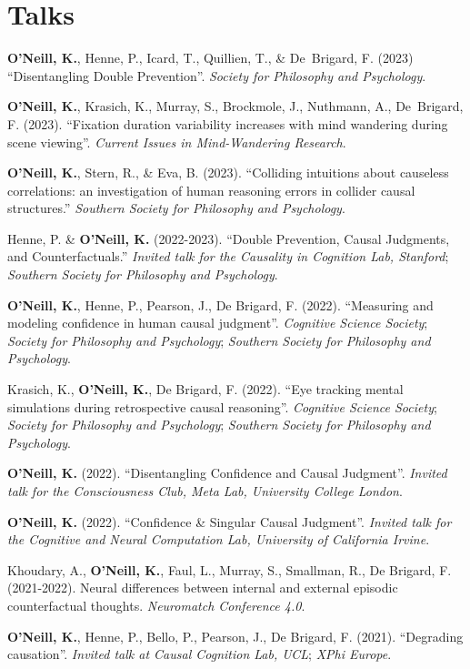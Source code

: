 \section{Talks}

\textbf{O'Neill, K.}, Henne, P., Icard, T., Quillien, T., \&
De~Brigard, F. (2023) ``Disentangling Double
Prevention''. \emph{Society for Philosophy and Psychology}.

\textbf{O'Neill, K.}, Krasich, K., Murray, S., Brockmole, J.,
Nuthmann, A., De~Brigard, F. (2023). ``Fixation duration variability
increases with mind wandering during scene viewing''. \emph{Current
Issues in Mind-Wandering Research}.

\textbf{O'Neill, K.}, Stern, R., \& Eva, B. (2023). ``Colliding
intuitions about causeless correlations: an investigation of human
reasoning errors in collider causal structures.'' \emph{Southern
Society for Philosophy and Psychology}.

Henne, P. \& \textbf{O'Neill, K.} (2022-2023). ``Double Prevention,
Causal Judgments, and Counterfactuals.'' \emph{Invited talk for the
Causality in Cognition Lab, Stanford}; \emph{Southern Society for
Philosophy and Psychology}.

\textbf{O'Neill, K.}, Henne, P., Pearson, J., De Brigard,
F. (2022). ``Measuring and modeling confidence in human causal
judgment''. \emph{Cognitive Science Society}; \emph{Society for
Philosophy and Psychology}; \emph{Southern Society for Philosophy and
Psychology}.

Krasich, K., \textbf{O'Neill, K.}, De Brigard, F. (2022). ``Eye
tracking mental simulations during retrospective causal
reasoning''. \emph{Cognitive Science Society}; \emph{Society for
Philosophy and Psychology}; \emph{Southern Society for Philosophy and
Psychology}.

\textbf{O'Neill, K.} (2022). ``Disentangling Confidence and Causal
Judgment''. \emph{Invited talk for the Consciousness Club, Meta Lab,
University College London}.

\textbf{O'Neill, K.} (2022). ``Confidence \& Singular Causal
Judgment''. \emph{Invited talk for the Cognitive and Neural
Computation Lab, University of California Irvine}.

Khoudary, A., \textbf{O’Neill, K.}, Faul, L., Murray, S., Smallman,
R., De Brigard, F. (2021-2022). Neural differences between internal
and external episodic counterfactual thoughts. \emph{Neuromatch
Conference 4.0}.

\textbf{O'Neill, K.}, Henne, P., Bello, P., Pearson, J., De Brigard,
F. (2021). ``Degrading causation''. \emph{Invited talk at Causal
Cognition Lab, UCL}; \emph{XPhi Europe}.

